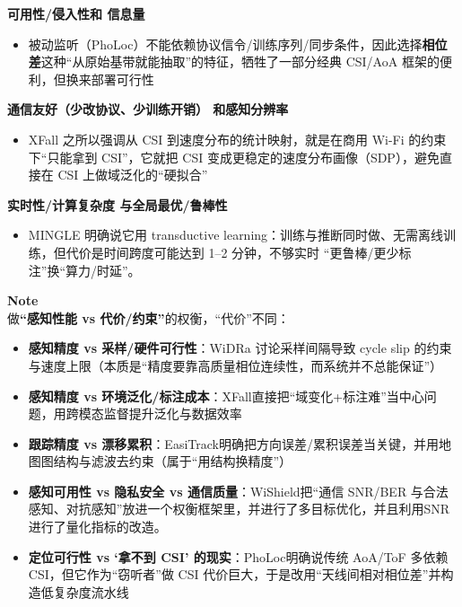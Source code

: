 \documentclass[
]{article}
\begin{document}
\textbf{可用性/侵入性和 信息量}

\begin{itemize}
\item
  被动监听（PhoLoc）不能依赖协议信令/训练序列/同步条件，因此选择\textbf{相位差}这种``从原始基带就能抽取''的特征，牺牲了一部分经典
  CSI/AoA 框架的便利，但换来部署可行性
\end{itemize}

\textbf{通信友好（少改协议、少训练开销） 和感知分辨率}

\begin{itemize}
\item
  XFall 之所以强调从 CSI 到速度分布的统计映射，就是在商用 Wi-Fi
  的约束下``只能拿到 CSI''，它就把 CSI
  变成更稳定的速度分布画像（SDP），避免直接在 CSI 上做域泛化的``硬拟合''
\end{itemize}

\textbf{实时性/计算复杂度 与全局最优/鲁棒性}

\begin{itemize}
\item
  MINGLE 明确说它用 transductive
  learning：训练与推断同时做、无需离线训练，但代价是时间跨度可能达到
  1--2 分钟，不够实时 ``更鲁棒/更少标注''换``算力/时延''。
\end{itemize}

\textbf{Note}\\

做\textbf{``感知性能 vs 代价/约束''}的权衡，``代价''不同：

\begin{itemize}
\item
  \textbf{感知精度 vs 采样/硬件可行性}：WiDRa 讨论采样间隔导致 cycle
  slip
  的约束与速度上限（本质是``精度要靠高质量相位连续性，而系统并不总能保证''）
\item
  \textbf{感知精度 vs
  环境泛化/标注成本}：XFall直接把``域变化+标注难''当中心问题，用跨模态监督提升泛化与数据效率
\item
  \textbf{跟踪精度 vs
  漂移累积}：EasiTrack明确把方向误差/累积误差当关键，并用地图图结构与滤波去约束（属于``用结构换精度''）
\item
  \textbf{感知可用性 vs 隐私安全 vs 通信质量}：WiShield把``通信 SNR/BER
  与合法感知、对抗感知''放进一个权衡框架里，并进行了多目标优化，并且利用SNR进行了量化指标的改造。
\item
  \textbf{定位可行性 vs `拿不到 CSI' 的现实}：PhoLoc明确说传统 AoA/ToF
  多依赖 CSI，但它作为``窃听者''做 CSI
  代价巨大，于是改用``天线间相对相位差''并构造低复杂度流水线
\end{itemize}
\end{document}
